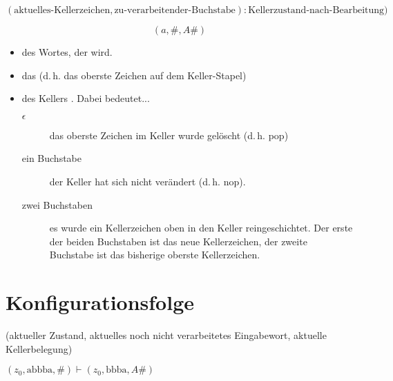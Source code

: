 \documentclass{lehramt-informatik-haupt}
\begin{document}
\begin{displaymath}
(
\text{aktuelles-Kellerzeichen},
\text{zu-verarbeitender-Buchstabe}):
\text{Kellerzustand-nach-Bearbeitung})
\end{displaymath}

\begin{displaymath}
(a, \#, A\#)
\end{displaymath}

\begin{itemize}
\item

 des Wortes, der  wird.

\item

das  (d.\,h. das oberste
Zeichen auf dem Keller-Stapel)

\item

 des Kellers . Dabei bedeutet...

\begin{description}
\item[$\epsilon$]

das oberste Zeichen im Keller wurde gelöscht (d.\,h. pop)

\item[ein Buchstabe]

der Keller hat sich nicht verändert (d.\,h. nop).

\item[zwei Buchstaben]

es wurde ein Kellerzeichen oben in den Keller reingeschichtet. Der erste
der beiden Buchstaben ist das neue Kellerzeichen, der zweite Buchstabe
ist das bisherige oberste Kellerzeichen.
\end{description}
\end{itemize}

%

\section{Konfigurationsfolge}

\begin{center}
(aktueller Zustand, aktuelles noch nicht verarbeitetes Eingabewort, aktuelle Kellerbelegung)
\end{center}

\begin{center}
$(z_0, \text{abbba}, \# ) \vdash (z_0, \text{bbba}, A\#)$
\end{center}

\literatur
\end{document}
